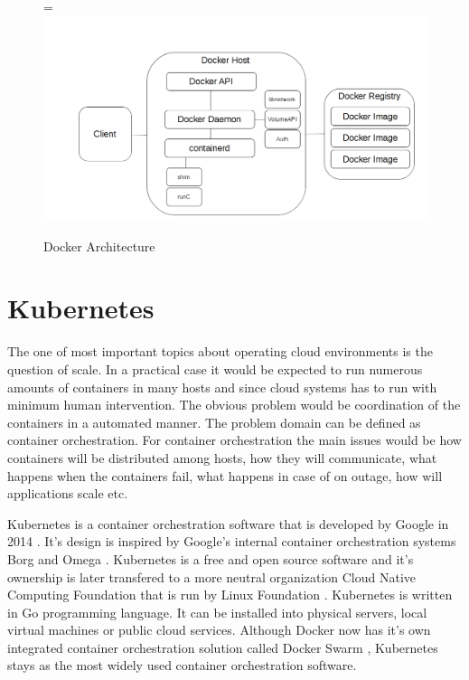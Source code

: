 \documentclass[12pt,oneandhalf,chaparabic,ceng,ms,eng,oneside,pntc]{gsufbe}
\makeatletter
\let\old@includegraphics\includegraphics
\renewcommand{\includegraphics}[2][,]{%
  \setbox9=\hbox{\old@includegraphics[#1]{#2}}%
  \ifdim\wd9>\textwidth
    \old@includegraphics[#1,width=\textwidth]{#2}%
  \else
    \old@includegraphics[#1]{#2}%
  \fi%
}
\makeatother
\begin{document}
\begin{figure}
\centering
\includegraphics[]{docker-arch.png}
\caption{Docker Architecture}
\label{fig:dockerarch}
\end{figure}

\section{Kubernetes}
The one of most important topics about operating cloud environments is the question of scale.  In a
practical case it would be expected to run numerous amounts of containers in many hosts and since
cloud systems has to run with minimum human intervention.  The obvious problem would be coordination
of the containers in a automated manner.  The problem domain can be defined as container orchestration.
For container orchestration the main issues would be how containers will be distributed among hosts,
how they will communicate, what happens when the containers fail, what happens in case of on outage,
how will applications scale etc.

Kubernetes is a container orchestration software that is developed by Google in 2014 \cite{Kubernetes}.
It's design is
inspired by Google's internal container orchestration systems Borg and Omega \cite{burns_borg_2016}.
Kubernetes is a free and open source software and it's ownership is later transfered to a more neutral
organization Cloud Native Computing Foundation \cite{cncf} that is run by Linux Foundation
\cite{linux_foundation}.  Kubernetes is written in Go programming language.
It can be installed into physical servers, local virtual machines or public cloud services.  Although
Docker now has it's own integrated container orchestration solution called Docker Swarm 
\cite{docker_swarm}, Kubernetes stays as the most widely used container orchestration software.
\end{document}
